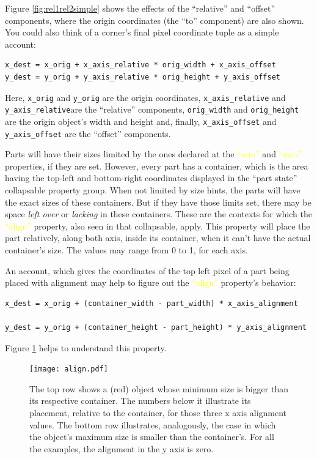 \documentclass[a4paper]{profusion}
\newcommand{\GUIEditable}[1]{\textcolor{yellow}{#1}} %
\begin{document}
Figure \ref{fig:rel1rel2simple} shows the effects of the ``relative''
and ``offset'' components, where the origin coordinates (the ``to''
component) are also shown. You could also think of a corner's final
pixel coordinate tuple as a simple account:

\begin{verbatim}
x_dest = x_orig + x_axis_relative * orig_width + x_axis_offset
y_dest = y_orig + y_axis_relative * orig_height + y_axis_offset
\end{verbatim}

Here, \texttt{x\_orig} and \texttt{y\_orig} are the origin
coordinates, \texttt{x\_axis\_relative} and
\texttt{y\_axis\_relative}are the ``relative'' components,
\texttt{orig\_width} and \texttt{orig\_height} are the origin object's
width and height and, finally, \texttt{x\_axis\_offset} and
\texttt{y\_axis\_offset} are the ``offset'' components.

Parts will have their sizes limited by the ones declared at the
\GUIEditable{``min''} and \GUIEditable{``max''} properties, if they
are set. However, every part has a container, which is the area having
the top-left and bottom-right coordinates displayed in the ``part
state'' collapsable property group. When not limited by size hints,
the parts will have the exact sizes of these containers. But if they
have those limits set, there may be space \emph{left over} or
\emph{lacking} in these containers. These are the contexts for which
the \GUIEditable{``align''} property, also seen in that collapsable,
apply. This property will place the part relatively, along both axis,
inside its container, when it can't have the actual container's
size. The values may range from 0 to 1, for each axis.

An account, which gives the coordinates of the top left pixel of a
part being placed with alignment may help to figure out the
\GUIEditable{``align''} property's behavior:

\begin{verbatim}
x_dest = x_orig + (container_width - part_width) * x_axis_alignment

y_dest = y_orig + (container_height - part_height) * y_axis_alignment
\end{verbatim}

Figure \ref{fig:align} helps to understand this property.

\begin{figure}
  \centering
  \texttt{[image: align.pdf]}
  \caption{The top row shows a (red) object whose minimum size is
    bigger than its respective container. The numbers below it
    illustrate its placement, relative to the container, for those
    three x axis alignment values. The bottom row illustrates,
    analogously, the case in which the object's maximum size is
    smaller than the container's. For all the examples, the alignment
    in the y axis is zero.}
  \label{fig:align}
\end{figure}
\end{document}

